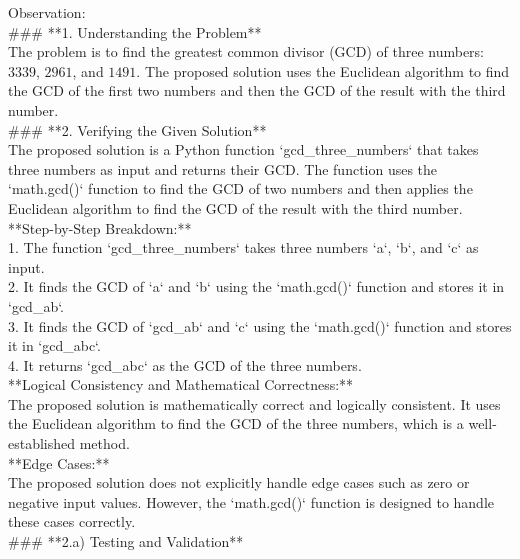 \begin{tcolorbox}[colback=lightblue, colframe=black, arc=2pt, breakable, title=Examine Answer Tool]
Observation:\\
\#\#\# **1. Understanding the Problem**\\

The problem is to find the greatest common divisor (GCD) of three numbers: $3339$, $2961$, and $1491$. The proposed solution uses the Euclidean algorithm to find the GCD of the first two numbers and then the GCD of the result with the third number.\\

\#\#\# **2. Verifying the Given Solution**\\

The proposed solution is a Python function `gcd\_three\_numbers` that takes three numbers as input and returns their GCD. The function uses the `math.gcd()` function to find the GCD of two numbers and then applies the Euclidean algorithm to find the GCD of the result with the third number.\\

**Step-by-Step Breakdown:**\\

1. The function `gcd\_three\_numbers` takes three numbers `a`, `b`, and `c` as input.\\
2. It finds the GCD of `a` and `b` using the `math.gcd()` function and stores it in `gcd\_ab`.\\
3. It finds the GCD of `gcd\_ab` and `c` using the `math.gcd()` function and stores it in `gcd\_abc`.\\
4. It returns `gcd\_abc` as the GCD of the three numbers.\\

**Logical Consistency and Mathematical Correctness:**\\

The proposed solution is mathematically correct and logically consistent. It uses the Euclidean algorithm to find the GCD of the three numbers, which is a well-established method.\\

**Edge Cases:**\\

The proposed solution does not explicitly handle edge cases such as zero or negative input values. However, the `math.gcd()` function is designed to handle these cases correctly.\\

\#\#\# **2.a) Testing and Validation**\\


\end{tcolorbox}
